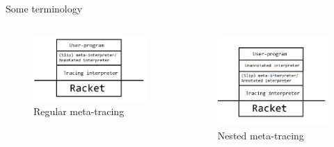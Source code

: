 \documentclass{beamer}
\begin{document}
\begin{frame}{Some terminology}
\begin{columns}[c]
        \begin{center}
       	 	\begin{figure}
            	\includegraphics[scale = 0.32]{Terminology_1.png}
            	\caption{Regular meta-tracing}
        	\end{figure}
        \end{center}
    \pause
        \begin{center}
       	 	\begin{figure}
            	\includegraphics[scale = 0.32]{Terminology_2.png}
            	\caption{Nested meta-tracing}
        	\end{figure}
        \end{center}
\end{columns}

\end{frame}
\end{document}
